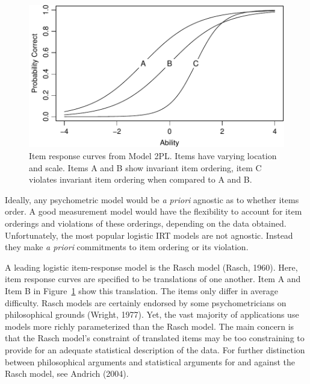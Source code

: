 \documentclass[english,,man]{apa6}
\begin{document}
\begin{figure}
\centering
\includegraphics{p_files/figure-latex/f2pl-1.pdf}
\caption{\label{fig:f2pl}Item response curves from Model 2PL. Items have varying location and scale. Items A and B show invariant item ordering, item C violates invariant item ordering when compared to A and B.}
\end{figure}

Ideally, any psychometric model would be \emph{a priori} agnostic as to whether items order. A good measurement model would have the flexibility to account for item orderings and violations of these orderings, depending on the data obtained. Unfortunately, the most popular logistic IRT models are not agnostic. Instead they make \emph{a priori} commitments to item ordering or its violation.

A leading logistic item-response model is the Rasch model (Rasch, 1960). Here, item response curves are specified to be translations of one another. Item A and Item B in Figure~\ref{fig:f2pl} show this translation. The items only differ in average difficulty. Rasch models are certainly endorsed by some psychometricians on philosophical grounds (Wright, 1977). Yet, the vast majority of applications use models more richly parameterized than the Rasch model. The main concern is that the Rasch model's constraint of translated items may be too constraining to provide for an adequate statistical description of the data. For further distinction between philosophical arguments and statistical arguments for and against the Rasch model, see Andrich (2004).
\end{document}
